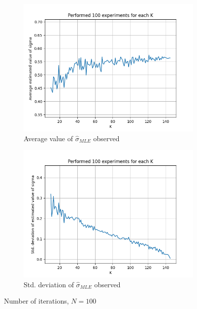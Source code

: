 \documentclass[fleqn, 11pt]{article}
\begin{document}
\newpage
\begin{figure}[H]
    \centering
    \begin{subfigure}[H]{0.49\textwidth}
        \centering
        \includegraphics[width=\textwidth]{P1/sigma/avgs_100.png}
        \caption[]{Average value of $\hat{\sigma}_{MLE}$ observed}
    \end{subfigure}
    \begin{subfigure}[H]{0.49\textwidth}
        \centering
        \includegraphics[width=\textwidth]{P1/sigma/stds_100.png}
        \caption[]{Std. deviation of $\hat{\sigma}_{MLE}$ observed}
    \end{subfigure}
    \caption{Number of iterations, $N = 100$}
\end{figure}
\end{document}
